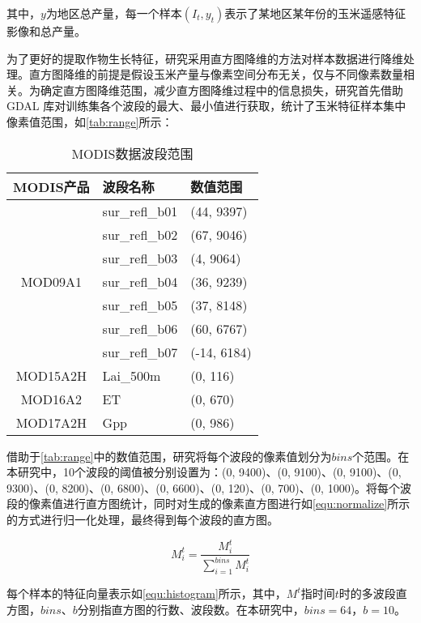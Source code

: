\par 其中，$y$为地区总产量，每一个样本$(I_t, y_t)$表示了某地区某年份的玉米遥感特征影像和总产量。

\par 为了更好的提取作物生长特征，研究采用直方图降维的方法对样本数据进行降维处理。直方图降维的前提是假设玉米产量与像素空间分布无关，仅与不同像素数量相关。为确定直方图降维范围，减少直方图降维过程中的信息损失，研究首先借助 GDAL 库对训练集各个波段的最大、最小值进行获取，统计了玉米特征样本集中像素值范围，如\autoref{tab:range}所示：

\begin{table}
  \centering
  \caption{MODIS数据波段范围}
  \label{tab:range}
  \begin{tabularx}{\linewidth}{cX<{\centering}X<{\centering}}
    \toprule
    MODIS产品 & 波段名称 & 数值范围 \\
    \midrule
    & sur\_refl\_b01 & (44, 9397) \\
    & sur\_refl\_b02 & (67, 9046) \\
    & sur\_refl\_b03 & (4, 9064) \\
    MOD09A1 & sur\_refl\_b04 & (36, 9239) \\
    & sur\_refl\_b05 & (37, 8148) \\
    & sur\_refl\_b06 & (60, 6767) \\
    & sur\_refl\_b07 & (-14, 6184) \\ \hline
    MOD15A2H  & Lai\_500m & (0, 116) \\ \hline
    MOD16A2   & ET & (0, 670) \\ \hline
    MOD17A2H  & Gpp & (0, 986) \\
    \bottomrule
\end{tabularx}
\end{table}

\par 借助于\autoref{tab:range}中的数值范围，研究将每个波段的像素值划分为$bins$个范围。在本研究中，10个波段的阈值被分别设置为：(0, 9400)、(0, 9100)、(0, 9100)、(0, 9300)、(0, 8200)、(0, 6800)、(0, 6600)、(0, 120)、(0, 700)、(0, 1000)。将每个波段的像素值进行直方图统计，同时对生成的像素直方图进行如\autoref{equ:normalize}所示的方式进行归一化处理，最终得到每个波段的直方图。

\begin{equation}
  \label{equ:normalize}
  M^t_{i}=\frac{M^t_{i}}{\sum_{i=1}^{bins}M^t_{i}}
\end{equation}

\par 每个样本的特征向量表示如\autoref{equ:histogram}所示，其中，$M^t$指时间$t$时的多波段直方图，$bins$、$b$分别指直方图的行数、波段数。在本研究中，$bins=64$，$b=10$。

